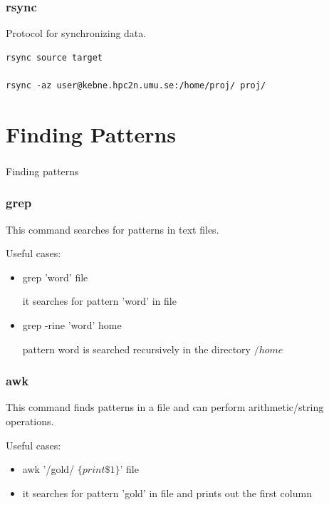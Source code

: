 \begin{frame}[fragile]
	\frametitle{ rsync}

Protocol for synchronizing data.
\begin{verbatim}
rsync source target

rsync -az user@kebne.hpc2n.umu.se:/home/proj/ proj/
\end{verbatim}
\end{frame}


\section{Finding Patterns}
\begin{frame}[fragile]
	\frametitle{}
\begin{center}
{\Huge
Finding patterns
}
\end{center}

\end{frame}

\begin{frame}
	\frametitle{ grep}
      This command searches for patterns in text files.

Useful cases:
	\begin{itemize}
        \item grep 'word' file

        it searches for pattern 'word' in file

        \item grep -rine 'word' home

        pattern word is searched recursively in the directory  $/home$
 
	\end{itemize}

\end{frame}

\begin{frame}
	\frametitle{ awk}
This command finds patterns in a file and can perform arithmetic/string operations.

Useful cases:
	\begin{itemize}
        \item awk '/gold/ $\{print  \$1 \} $' file

        \item it searches for pattern 'gold' in file and prints out the first column 

	\end{itemize}

\end{frame}

